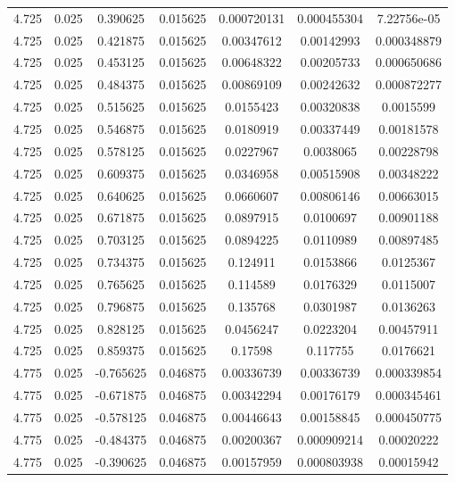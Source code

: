 \begin{table}[bh]
\begin{center}
{\begin{tabular}{ccccccc}
4.725	 & 0.025 & 	0.390625	 & 0.015625	 & 0.000720131	 & 0.000455304	 & 7.22756e-05 \\ 
4.725	 & 0.025 & 	0.421875	 & 0.015625	 & 0.00347612	 & 0.00142993	 & 0.000348879 \\ 
4.725	 & 0.025 & 	0.453125	 & 0.015625	 & 0.00648322	 & 0.00205733	 & 0.000650686 \\ 
4.725	 & 0.025 & 	0.484375	 & 0.015625	 & 0.00869109	 & 0.00242632	 & 0.000872277 \\ 
4.725	 & 0.025 & 	0.515625	 & 0.015625	 & 0.0155423	 & 0.00320838	 & 0.0015599 \\ 
4.725	 & 0.025 & 	0.546875	 & 0.015625	 & 0.0180919	 & 0.00337449	 & 0.00181578 \\ 
4.725	 & 0.025 & 	0.578125	 & 0.015625	 & 0.0227967	 & 0.0038065	 & 0.00228798 \\ 
4.725	 & 0.025 & 	0.609375	 & 0.015625	 & 0.0346958	 & 0.00515908	 & 0.00348222 \\ 
4.725	 & 0.025 & 	0.640625	 & 0.015625	 & 0.0660607	 & 0.00806146	 & 0.00663015 \\ 
4.725	 & 0.025 & 	0.671875	 & 0.015625	 & 0.0897915	 & 0.0100697	 & 0.00901188 \\ 
4.725	 & 0.025 & 	0.703125	 & 0.015625	 & 0.0894225	 & 0.0110989	 & 0.00897485 \\ 
4.725	 & 0.025 & 	0.734375	 & 0.015625	 & 0.124911	 & 0.0153866	 & 0.0125367 \\ 
4.725	 & 0.025 & 	0.765625	 & 0.015625	 & 0.114589	 & 0.0176329	 & 0.0115007 \\ 
4.725	 & 0.025 & 	0.796875	 & 0.015625	 & 0.135768	 & 0.0301987	 & 0.0136263 \\ 
4.725	 & 0.025 & 	0.828125	 & 0.015625	 & 0.0456247	 & 0.0223204	 & 0.00457911 \\ 
4.725	 & 0.025 & 	0.859375	 & 0.015625	 & 0.17598	 & 0.117755	 & 0.0176621 \\ 
4.775	 & 0.025 & 	-0.765625	 & 0.046875	 & 0.00336739	 & 0.00336739	 & 0.000339854 \\ 
4.775	 & 0.025 & 	-0.671875	 & 0.046875	 & 0.00342294	 & 0.00176179	 & 0.000345461 \\ 
4.775	 & 0.025 & 	-0.578125	 & 0.046875	 & 0.00446643	 & 0.00158845	 & 0.000450775 \\ 
4.775	 & 0.025 & 	-0.484375	 & 0.046875	 & 0.00200367	 & 0.000909214	 & 0.00020222 \\ 
4.775	 & 0.025 & 	-0.390625	 & 0.046875	 & 0.00157959	 & 0.000803938	 & 0.00015942 \\ 

\end{tabular}}
\end{center}
\end{table}
